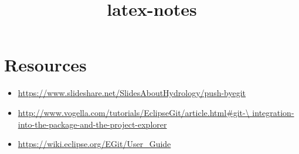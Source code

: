 \documentclass{report}
\title{latex-notes}
\begin{document}
\tableofcontents




\part{Resources}
\begin{itemize}
  \item \url{https://www.slideshare.net/SlidesAboutHydrology/push-byegit}
  \item \url{http://www.vogella.com/tutorials/EclipseGit/article.html#git-\
  integration-into-the-package-and-the-project-explorer}
  \item \url{https://wiki.eclipse.org/EGit/User_Guide}
\end{itemize}
\end{document}
